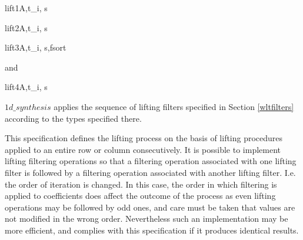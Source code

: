 \begin{pseudo}{lift1}{A,t_i, s}
    \bsEND
\bsEND
\end{pseudo}

\begin{pseudo}{lift2}{A,t_i, s}
    \bsEND
\bsEND
\end{pseudo}

\begin{pseudo}{lift3}{A,t_i, s,fsort}
    \bsEND
\bsEND
\end{pseudo}

and

\begin{pseudo}{lift4}{A,t_i, s}
    \bsEND
\bsEND
\end{pseudo}

$1d\_synthesis$ applies the sequence of lifting filters specified in Section \ref{wltfilters}
according to the types specified there.

\begin{informative}
This specification defines the lifting process on the basis of lifting
procedures applied to an entire row or column consecutively. It is
possible to implement lifting filtering operations so that a filtering
operation associated with one lifting filter is followed by a filtering
operation associated with another lifting filter. I.e. the order of
iteration is changed. In this case, the order in which filtering is
applied to coefficients does affect the outcome of the process as even
lifting operations may be followed by odd ones, and care must be taken
that values are not modified in the wrong order. Nevertheless such an
implementation may be more efficient, and complies with this
specification if it produces identical results.
\end{informative}


